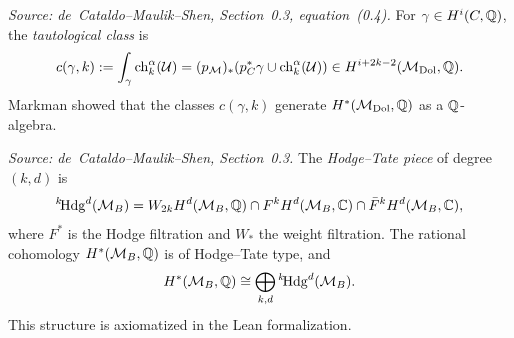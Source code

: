\begin{definition}
  \label{def:TautologicalClass}
  \textit{Source: de~Cataldo--Maulik--Shen, Section~0.3, equation~(0.4).}
  For \(\gamma \in H^i(C,\mathbb{Q})\), the \emph{tautological class} is
  \[
    c(\gamma,k) := \int_\gamma \operatorname{ch}_k^\alpha(\mathcal{U})
      = (p_{\mathcal{M}})_*(p_C^* \gamma \cup \operatorname{ch}_k^\alpha(\mathcal{U}))
      \in H^{i+2k-2}(\mathcal{M}_{\mathrm{Dol}}, \mathbb{Q}).
  \]
  Markman showed that the classes \(c(\gamma,k)\) generate
  \(H^*(\mathcal{M}_{\mathrm{Dol}}, \mathbb{Q})\) as a \(\mathbb{Q}\)-algebra.
\end{definition}

\begin{definition}
  \label{def:HodgeTateDecomp}
  \textit{Source: de~Cataldo--Maulik--Shen, Section~0.3.}
  The \emph{Hodge--Tate piece} of degree \((k,d)\) is
  \[
    {}^{k}\!\mathrm{Hdg}^{d}(\mathcal{M}_B)
      = W_{2k} H^d(\mathcal{M}_B,\mathbb{Q}) \cap F^k H^d(\mathcal{M}_B,\mathbb{C})
        \cap \bar{F}^k H^d(\mathcal{M}_B,\mathbb{C}),
  \]
  where \(F^*\) is the Hodge filtration and \(W_*\) the weight filtration.
  The rational cohomology \(H^*(\mathcal{M}_B,\mathbb{Q})\) is of Hodge--Tate type, and
  \[
    H^*(\mathcal{M}_B,\mathbb{Q}) \cong \bigoplus_{k,d} {}^{k}\!\mathrm{Hdg}^{d}(\mathcal{M}_B).
  \]
  This structure is axiomatized in the Lean formalization.
\end{definition}


